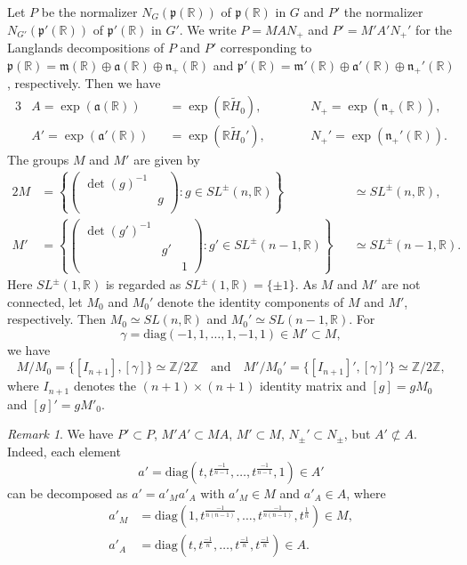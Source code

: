 \documentclass[reqno,11pt]{amsart}
\theoremstyle{remark}
\newtheorem{rem}[equation]{Remark}
\theoremstyle{definition}
\numberwithin{equation}{section}
\newcommand{\fa}{{\mathfrak a}}
\newcommand{\fm}{{\mathfrak m}}
\newcommand{\fn}{{\mathfrak n}}
\newcommand{\fp}{{\mathfrak p}}
\newcommand{\R}{\mathbb{R}}
\newcommand{\Z}{\mathbb{Z}}
\newcommand{\wH}{\widetilde{H}}
\newcommand{\diag}{\mathrm{diag}}
\begin{document}
Let $P$ be  the normalizer $N_G(\fp(\R))$ of $\fp(\R)$ in $G$
and $P'$ the normalizer $N_{G'}(\fp'(\R))$ of $\fp'(\R)$ in $G'$.
We write $P=MAN_+$ and $P'=M'A'N_+'$
for the Langlands decompositions of $P$ and $P'$ corresponding to 
$\fp(\R)=\fm(\R) \oplus \fa(\R) \oplus \fn_+(\R)$ and 
$\fp'(\R)=\fm'(\R) \oplus \fa'(\R) \oplus \fn_+'(\R)$,
respectively.
Then we have
\begin{alignat*}{3}
&A = \exp(\fa(\R)) &&= \exp(\R \wH_0), \qquad 
&&N_+=\exp(\fn_+(\R)),\\
&A' = \exp(\fa'(\R)) &&= \exp(\R \wH_0'), \qquad
&&N_+'=\exp(\fn_+'(\R)). 
\end{alignat*}
The groups $M$ and $M'$ are  given by
\begin{alignat*}{2}
M&= 
\left\{
\begin{pmatrix}
\det(g)^{-1} &\\
& g\\
\end{pmatrix}
:
g \in SL^{\pm}(n,\R)
\right\}
&&\simeq SL^{\pm}(n,\R),\\
M'&= 
\left\{
\begin{pmatrix}
\det(g')^{-1} & & \\
& g' &\\
&&1
\end{pmatrix}
:
g' \in SL^{\pm}(n-1,\R)
\right\}
&&\simeq SL^{\pm}(n-1,\R).
\end{alignat*}
Here $SL^{\pm}(1,\R)$ is regarded as
$SL^{\pm}(1,\R) = \{\pm 1\}$.
As $M$ and $M'$ are not connected, 
let $M_0$ and $M_0'$ denote the identity components of $M$ and $M'$,
respectively.
Then $M_0 \simeq SL(n,\R)$ and $M_0' \simeq SL(n-1,\R)$.
For
\begin{equation*}%
\gamma = \diag(-1, 1, \ldots, 1, -1, 1) \in M' \subset M,
\end{equation*}
we have
\begin{equation*}
M/M_0 = \{[I_{n+1}], [\gamma]\} \simeq \Z/2\Z
\quad
\text{and}
\quad
M'/M_0' = \{[I_{n+1}]', [\gamma]'\} \simeq \Z/2\Z,
\end{equation*}
where $I_{n+1}$ denotes the $(n+1) \times (n+1)$ identity matrix and 
$[g] = g M_0$ and $[g]' = g M'_0$.

\begin{rem}\label{rem:A}
We have
$P' \subset P$, $M'A' \subset MA$, $M' \subset M$, $N_{\pm}'\subset N_{\pm}$,
but $A' \not \subset A$. Indeed, each element
\begin{equation*}
a' = \diag(t, t^{\frac{-1}{n-1}}, \ldots, t^{\frac{-1}{n-1}}, 1) \in A'
\end{equation*}
can be decomposed as
$a' = a'_M a'_A$ with $a'_M \in M$ and $a'_A \in A$, where
\begin{align*}
a'_M 
&= \diag(1,t^{\frac{-1}{n(n-1)}},\ldots, t^{\frac{-1}{n(n-1)}} ,t^{\frac{1}{n}})
\in M,\\
a'_A
&= \diag(t,t^{\frac{-1}{n}},\ldots ,t^{\frac{-1}{n}} ,t^{\frac{-1}{n}}) 
\in A.
\end{align*}

\end{rem}
\end{document}
